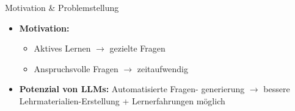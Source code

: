\documentclass[usenames, dvipsnames, aspectratio=32]{beamer}
\begin{document}
\begin{frame}[allowframebreaks]{Motivation \& Problemstellung}
    \begin{itemize}
        \item \textbf{Motivation:} 
        \begin{itemize}
            \item Aktives Lernen $\to$ gezielte Fragen
            \item Anspruchsvolle Fragen $\to$ zeitaufwendig \cite{steuer_i_2021} 
        \end{itemize}
        \vspace{.5em}
        \item \textbf{Potenzial von LLMs:} Automatisierte Fragen- generierung $\to$ bessere Lehrmaterialien-Erstellung + Lernerfahrungen möglich \cite{naveed_comprehensive_2024}
        \framebreak


\end{itemize}
\end{frame}
\end{document}
